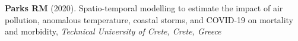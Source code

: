 \noindent \textbf{Parks RM} (2020). Spatio-temporal modelling to estimate the impact of air pollution, anomalous temperature, coastal storms, and COVID-19 on mortality and morbidity,  \textit{Technical University of Crete, Crete, Greece} \medskip











